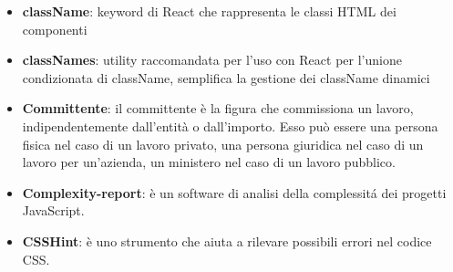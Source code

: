\begin{itemize}
\item[] \textbf{className}: keyword di React che rappresenta le classi HTML dei componenti
\item[] \textbf{classNames}: utility raccomandata per l'uso con React per l'unione condizionata di className, semplifica la gestione dei className dinamici
\item[] \textbf{Committente}: il committente è la figura che commissiona un lavoro, indipendentemente dall'entità o dall'importo. Esso può essere una persona fisica nel caso di un lavoro privato, una persona giuridica nel caso di un lavoro per un'azienda, un ministero nel caso di un lavoro pubblico.
\item[] \textbf{Complexity-report}: è un software di analisi della complessit\'a dei progetti JavaScript.
\item[] \textbf{CSSHint}: è uno strumento che aiuta a rilevare possibili errori nel codice CSS.
\end{itemize}
\newpage

